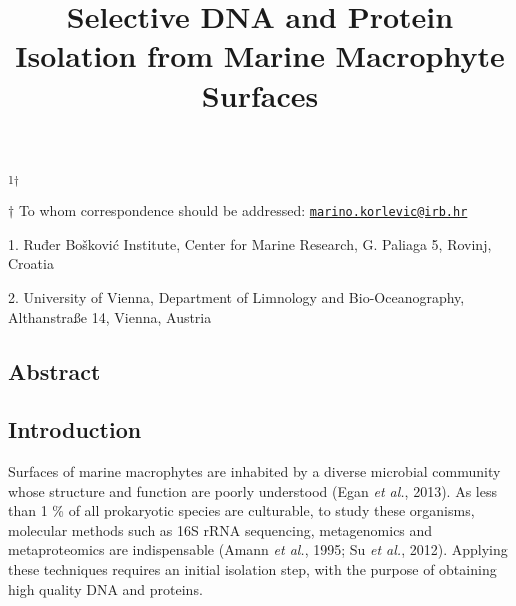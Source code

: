 \documentclass[12pt,]{article}
\title{\textbf{Selective DNA and Protein Isolation from Marine Macrophyte
Surfaces}}
\author{}
\date{}
\begin{document}
\maketitle

\vspace{80mm}

\textsuperscript{1\(\dagger\)}

\vspace{40mm}

\(\dagger\) To whom correspondence should be addressed:
\href{mailto:marino.korlevic@irb.hr}{\nolinkurl{marino.korlevic@irb.hr}}

1. Ruđer Bošković Institute, Center for Marine Research, G. Paliaga 5,
Rovinj, Croatia

2. University of Vienna, Department of Limnology and Bio-Oceanography,
Althanstraße 14, Vienna, Austria \newpage \linenumbers
{} \setlength\parindent{24pt}

\hypertarget{abstract}{%
\subsection{Abstract}\label{abstract}}

\newpage

\hypertarget{introduction}{%
\subsection{Introduction}\label{introduction}}

Surfaces of marine macrophytes are inhabited by a diverse microbial
community whose structure and function are poorly understood (Egan
\emph{et al.}, 2013). As less than 1 \% of all prokaryotic species are
culturable, to study these organisms, molecular methods such as 16S rRNA
sequencing, metagenomics and metaproteomics are indispensable (Amann
\emph{et al.}, 1995; Su \emph{et al.}, 2012). Applying these techniques
requires an initial isolation step, with the purpose of obtaining high
quality DNA and proteins.
\end{document}
